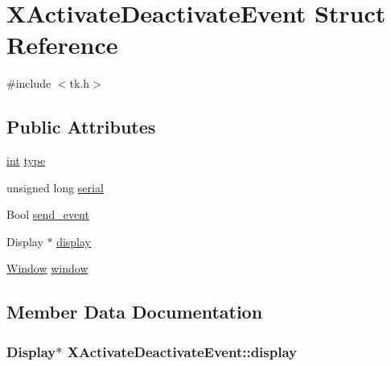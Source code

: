 \hypertarget{struct_x_activate_deactivate_event}{}\section{X\+Activate\+Deactivate\+Event Struct Reference}
\label{struct_x_activate_deactivate_event}


{\ttfamily \#include $<$tk.\+h$>$}

\subsection*{Public Attributes}
\begin{DoxyCompactItemize}
\item 
\hyperlink{tk_8h_a83f82f76e7fed06f4c49d2db94028a6d}{int} \hyperlink{struct_x_activate_deactivate_event_ac4a5d2abebf391042e9a18d1ca3887b3}{type}
\item 
unsigned long \hyperlink{struct_x_activate_deactivate_event_a251bc209858b9c3128d9e5033c581694}{serial}
\item 
Bool \hyperlink{struct_x_activate_deactivate_event_ada925833926718350b0bce03d8ed8818}{send\+\_\+event}
\item 
Display $\ast$ \hyperlink{struct_x_activate_deactivate_event_af02926f45f54663f8be135d4eac280bf}{display}
\item 
\hyperlink{tk_8h_a98fe30ba305baa90aa6ae1f474c1e338}{Window} \hyperlink{struct_x_activate_deactivate_event_a72d16f7aff7621a6ae2512773e8dd8b0}{window}
\end{DoxyCompactItemize}


\subsection{Member Data Documentation}
\subsubsection[{\texorpdfstring{display}{display}}]{\setlength{\rightskip}{0pt plus 5cm}Display$\ast$ X\+Activate\+Deactivate\+Event\+::display}\hypertarget{struct_x_activate_deactivate_event_af02926f45f54663f8be135d4eac280bf}{}\label{struct_x_activate_deactivate_event_af02926f45f54663f8be135d4eac280bf}
